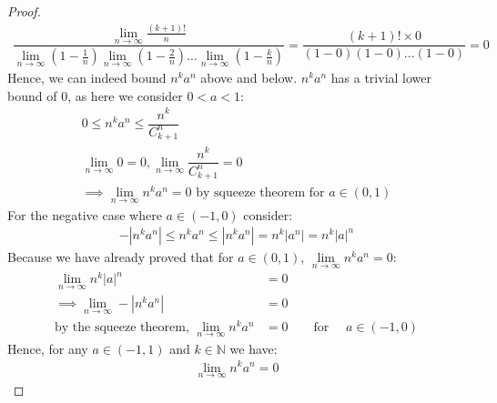 \documentclass[12pt]{book}
\theoremstyle{definition}
\begin{document}
\begin{proof}
\begin{align*}
	 \dfrac{\lim\limits_{n\to \infty}\frac{(k+1)!}{n}}{\lim\limits_{n\to \infty}(1-\frac{1}{n})\lim\limits_{n\to \infty}(1-\frac{2}{n})...\lim\limits_{n\to \infty}(1-\frac{k}{n})} = \dfrac{(k+1)! \times 0}{(1-0)(1-0)...(1-0)} =0
\end{align*}
Hence, we can indeed bound $n^ka^n$ above and below. $n^ka^n$ has a trivial lower bound of $0$, as here we consider $0<a<1$:
\begin{gather*}
0\leq 	n^ka^n \leq \dfrac{n^k}{C^n_{k+1}} \\
\lim\limits_{n \to \infty}0 =0 ,\lim\limits_{n \to \infty}\dfrac{n^k}{C^n_{k+1}} =0\\
\implies \lim\limits_{n \to \infty} n^ka^n =0 \text{ by squeeze theorem for } a \in (0,1)
\end{gather*}
For the negative case where $a \in (-1,0)$ consider:
\begin{align*}
-|n^ka^n| \leq n^ka^n \leq |n^ka^n| = n^k|a^n| =n^k|a|^n
\end{align*}
Because we have already proved that for $a \in (0,1)$, $\lim\limits_{n \to \infty}n^ka^n =0$:
\begin{align*}
\lim\limits_{n \to \infty} n^k|a|^n &=0 \\
\implies \lim\limits_{n \to \infty}-|n^ka^n| &=0	 \\
\text{by the squeeze theorem, } \lim\limits_{n \to \infty} n^ka^n &=0 \qquad \text{for } \quad a \in (-1,0)
\end{align*}
Hence, for any $a \in (-1,1)$ and $k \in \mathbb{N}$ we have:
\begin{align*}
\lim\limits_{n \to \infty} n^ka^n =0
\end{align*} 
\end{proof}
\end{document}
